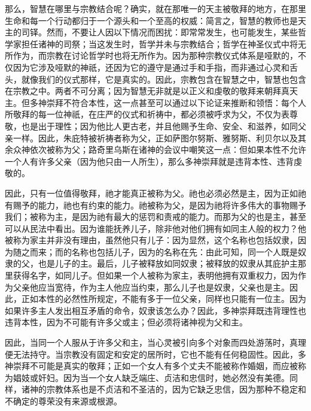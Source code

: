 那么，智慧在哪里与宗教结合呢？确实，就在那唯一的天主被敬拜的地方，在那里生命和每一个行动都归于一个源头和一个至高的权威：简言之，智慧的教师也是天主的司铎。然而，不要让人因以下情况而困扰：即常常发生，也可能发生，某些哲学家担任诸神的司祭；当这发生时，哲学并未与宗教结合；哲学在神圣仪式中将无所作为，而宗教在讨论哲学时也将无所作为。因为那种宗教仪式体系是哑默的，不仅因为它涉及哑默的神祇，还因为它的遵守是通过手和手指，而非通过心灵和舌头，就像我们的仪式那样，它是真实的。因此，宗教包含在智慧之中，智慧也包含在宗教之中。两者不可分离；因为智慧无非就是以正义和虔敬的敬拜来朝拜真天主。但多神崇拜不符合本性，这一点甚至可以通过以下论证来推断和领悟：每个人所敬拜的每一位神祇，在庄严的仪式和祈祷中，都必须被呼求为父，不仅为表尊敬，也是出于理性；因为他比人更古老，并且他赐予生命、安全、和滋养，如同父亲一样。因此，朱庇特被祈祷者称为父，正如萨图尔努斯、雅努斯、利贝尔以及其余众神依次被称为父；路奇里乌斯在诸神的会议中嘲笑这一点：但如果本性不允许一个人有许多父亲（因为他只由一人所生），那么多神崇拜就是违背本性、违背虔敬的。\par

因此，只有一位值得敬拜，祂才能真正被称为父。祂也必须必然是主，因为正如祂有赐予的能力，祂也有约束的能力。祂被称为父，是因为祂将许多伟大的事物赐予我们；被称为主，是因为祂有最大的惩罚和责戒的能力。而那为父的也是主，甚至可以从民法中看出。因为谁能抚养儿子，除非他对他们拥有如同主人般的权力？他被称为家主并非没有理由，虽然他只有儿子：因为显然，这个名称也包括奴隶，因为随之而来；而的名称也包括儿子，因为的名称在先：由此可知，同一个人既是奴隶的父，也是儿子的主。最后，儿子被释放如同奴隶；被释放的奴隶从其庇护主那里获得名字，如同儿子。但如果一个人被称为家主，表明他拥有双重权力，因为作为父亲他应当宽待，作为主人他应当约束，那么儿子也是奴隶，父亲也是主。因此，正如本性的必然性所规定，不能有多于一位父亲，同样也只能有一位主。因为如果许多主人发出相互矛盾的命令，奴隶该怎么办？因此，多神崇拜既违背理性也违背本性，因为不可能有许多父或主；但必须将诸神视为父和主。\par

因此，当同一个人服从于许多父和主，当心灵被引向多个对象而四处游荡时，真理便无法持守。当宗教没有固定和安定的居所时，它也不能有任何稳固性。因此，多神崇拜不可能是真实的敬拜；正如一个女人有多个丈夫不能被称作婚姻，而应被称为娼妓或奸妇。因为当一个女人缺乏端庄、贞洁和忠信时，她必然没有美德。同样，诸神的宗教体系也是不贞洁和不圣洁的，因为它缺乏忠信，因为那种不稳定和不确定的尊荣没有来源或根源。\par

